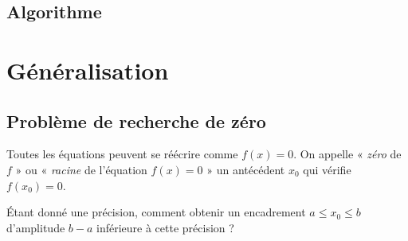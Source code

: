\subsection*{Algorithme}

\newpage

\section*{Généralisation}

\subsection*{Problème de recherche de zéro}
	Toutes les équations peuvent se réécrire comme $f(x) = 0$.
	On appelle « \emph{zéro} de $f$ » ou « \emph{racine} de l'équation $f(x) = 0$ » un antécédent $x_0$ qui vérifie $f(x_0) = 0$.

	\begin{namedtheorem}[Problème]
	Étant donné une précision, comment obtenir un encadrement
		\mbox{$ a \leq x_0 \leq b $}
	d'amplitude $b-a$ inférieure à cette précision ?
	\end{namedtheorem}

